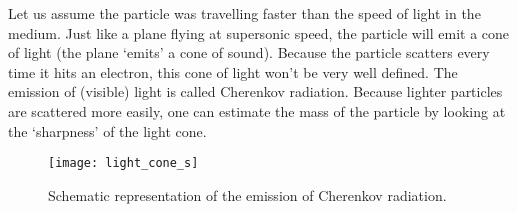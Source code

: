 Let us assume the particle was travelling faster than the speed of light in the medium. Just like a plane flying at supersonic speed, the particle will emit a cone of light (the plane `emits' a cone of sound). Because the particle scatters every time it hits an electron, this cone of light won't be very well defined. The emission of (visible) light is called Cherenkov radiation. Because lighter particles are scattered more easily, one can estimate the mass of the particle by looking at the `sharpness' of the light cone.

\begin{figure}\begin{center}
\texttt{[image: light\_cone\_s]}%
\caption{Schematic representation of the emission of Cherenkov radiation.}\label{fig:light_cone}
\end{center}\end{figure}

